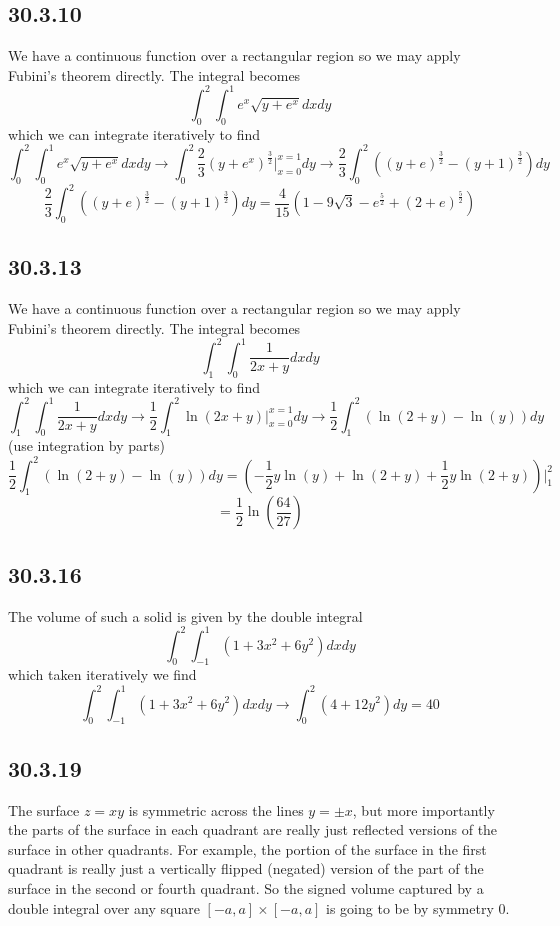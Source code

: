 \documentclass{article}
\begin{document}
\subsection{30.3.10}

We have a continuous function over a rectangular region so we may apply Fubini's theorem directly. The integral becomes $$\int_0^2\int_0^1 e^x\sqrt{y+e^x}dxdy$$ which we can integrate iteratively to find $$\int_0^2\int_0^1 e^x\sqrt{y+e^x}dxdy \to \int_0^2 \frac{2}{3}(y+e^x)^{\frac{3}{2}}\bigg|_{x=0}^{x=1}dy \to \frac{2}{3}\int_0^2 ((y+e)^{\frac{3}{2}} - (y+1)^{\frac{3}{2}})dy$$
$$\frac{2}{3}\int_0^2 ((y+e)^{\frac{3}{2}} - (y+1)^{\frac{3}{2}})dy = \frac{4}{15} (1 - 9 \sqrt{3} - e^{\frac{5}{2}} + (2 + e)^{\frac{5}{2}})$$

\subsection{30.3.13}

We have a continuous function over a rectangular region so we may apply Fubini's theorem directly. The integral becomes $$\int_1^2\int_0^1 \frac{1}{2x+y}dxdy$$ which we can integrate iteratively to find $$\int_1^2\int_0^1 \frac{1}{2x+y}dxdy\to \frac{1}{2}\int_1^2 \ln(2x+y)\bigg|_{x=0}^{x=1}dy \to \frac{1}{2}\int_1^2 (\ln(2+y) - \ln(y))dy$$
(use integration by parts)
$$\frac{1}{2}\int_1^2 (\ln(2+y) - \ln(y))dy = \left(-\frac{1}{2} y \ln(y) + \ln(2 + y) + \frac{1}{2} y \ln(2 + y)\right)\bigg|_1^2$$
$$ = \frac{1}{2}\ln\left(\frac{64}{27}\right)$$

\subsection{30.3.16}

The volume of such a solid is given by the double integral $$\int_0^2\int_{-1}^1 (1+3x^2+6y^2)dxdy$$ which taken iteratively we find $$\int_0^2\int_{-1}^1 (1+3x^2+6y^2)dxdy \to \int_0^2 (4+12y^2) dy = 40$$

\subsection{30.3.19}

The surface $z=xy$ is symmetric across the lines $y=\pm x$, but more importantly the parts of the surface in each quadrant are really just reflected versions of the surface in other quadrants. For example, the portion of the surface in the first quadrant is really just a vertically flipped (negated) version of the part of the surface in the second or fourth quadrant. So the signed volume captured by a double integral over any square $[-a,a]\times[-a,a]$ is going to be by symmetry 0.
\end{document}
